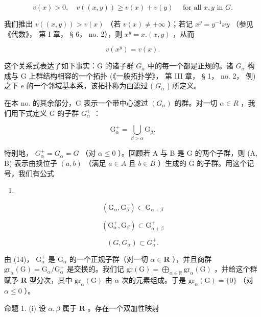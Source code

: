 \[
v (x) > 0, \quad v ((x, y)) \geqslant v (x) + v (y) \quad \text { for   all } x, y \text { in } G.\tag{10}
\]

我们推出 \(v((x,y)) > v(x)\) （若 \(v(x) \neq +\infty\) ）；若记 \(x^y = y^{-1}xy\) （参见《代数》， 第 I 章， § 6， no. 2），则 \(x^y = x.(x,y)\) ，从而

\[
v (x ^ {y}) = v (x).\tag{11}
\]

这个关系式表达了如下事实：G 的诸子群 \(G_{\alpha}\) 中的每一个都是正规的。诸 \(G_{\alpha}\) 构成与 G 上群结构相容的一个拓扑 (《一般拓扑学》， 第 III 章， § 1， no. 2， 例) 之下 e 的一个邻域基本系，该拓扑称为由滤过 ( \(G_{\alpha}\) ) 所定义。

在本 no. 的其余部分，G 表示一个带中心滤过 \((G_{\alpha})\) 的群。对一切 \(\alpha \in R\) ，我们用下式定义 G 的子群 \(G_{\alpha}^{+}\) ：

\[
\mathrm{G} _ {\alpha} ^ {+} = \bigcup_ {\beta > \alpha} \mathrm{G} _ {\beta}.\tag{12}
\]

特别地， \(G_{\alpha}^{+} = G_{\alpha} = G\) （对 \(\alpha \leqslant 0\) ）。回顾若 A 与 B 是 G 的两个子群，则 (A, B) 表示由换位子 \((a, b)\) （满足 \(a \in A\) 且 \(b \in B\) ）生成的 G 的子群。用这个记号，我们有公式

\begin{enumerate}
\def\labelenumi{(\arabic{enumi})}
\setcounter{enumi}{12}
\tightlist
\item
\end{enumerate}

\[
\left(\mathrm{G} _ {\alpha}, \mathrm{G} _ {\beta}\right) \subset \mathrm{G} _ {\alpha + \beta}\tag{13}
\]

\[
\left(\mathrm{G} _ {\alpha} ^ {+}, \mathrm{G} _ {\beta}\right) \subset \mathrm{G} _ {\alpha + \beta} ^ {+}\tag{13'}
\]

\[
(G, G _ {\alpha}) \subset G _ {\alpha} ^ {+}.\tag{14}
\]

由 (14)， \(\mathrm{G}_{\alpha}^{+}\) 是 \(\mathrm{G}_{\alpha}\) 的一个正规子群（对一切 \(\alpha \in \mathbf{R}\) ），并且商群 \(\mathrm{gr}_{\alpha}(\mathrm{G}) = \mathrm{G}_{\alpha} / \mathrm{G}_{\alpha}^{+}\) 是交换的。我们记 \(\mathrm{gr}(\mathrm{G}) = \bigoplus_{\alpha \in \mathbb{R}}\mathrm{gr}_{\alpha}(\mathrm{G})\) ，并给这个群赋予 \(\mathbf{R}\) 型分次，其中 \(\mathrm{gr}_{\alpha}(\mathrm{G})\) 由 \(\alpha\) 次的元素组成。于是 \(\mathrm{gr}_{\alpha}(\mathrm{G}) = \{0\}\) （对 \(\alpha \leqslant 0\) ）。

命题 1. (i) 设 \(\alpha, \beta\) 属于 \(\mathbf{R}\) 。存在一个双加性映射

